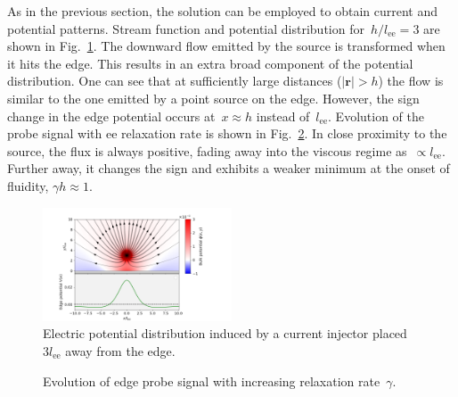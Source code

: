 \documentclass[preprint,aps,eqsecnum, prb]{revtex4-1}
\begin{document}
As in the previous section, the solution can be employed to obtain current
and potential patterns. Stream function and potential distribution
for~$h/l_\mathrm{ee} = 3$ are shown in Fig.~\ref{fig:bulk-rho}.
The downward flow emitted by the source is transformed
when it hits the edge. This results in an extra broad component of
the potential distribution.
One can see that at sufficiently large distances ($|{\bm r}| > h$) the flow
is similar to the one emitted by a point source on the edge. However,
the sign change in the edge potential occurs at~$x \approx h$
instead of~$l_\mathrm{ee}$.
Evolution of the probe signal with ee relaxation rate is shown in
Fig.~\ref{fig:flux-vs-gamma-h}. In close proximity to the source,
the flux is always positive, fading away into the viscous regime
as~$\propto l_\mathrm{ee}$. Further away, it changes the sign
and exhibits a weaker minimum at the onset of fluidity, $\gamma h \approx 1$.
%  
\begin{figure}
  \includegraphics[width=0.5\textwidth, trim= 2.0in 0in 3in 1in]{combined-phi-h=3-asym.png}
  \caption{
    \label{fig:bulk-rho}
    Electric  potential distribution induced by a current injector
    placed~$3l_\mathrm{ee}$ away from the edge.
  }
\end{figure}
\begin{figure}
  \def\svgwidth{0.5\textwidth}
  
  \caption{
    \label{fig:flux-vs-gamma-h}
    Evolution of edge probe signal with increasing relaxation rate~$\gamma$.
  }
\end{figure}
%  
\end{document}
